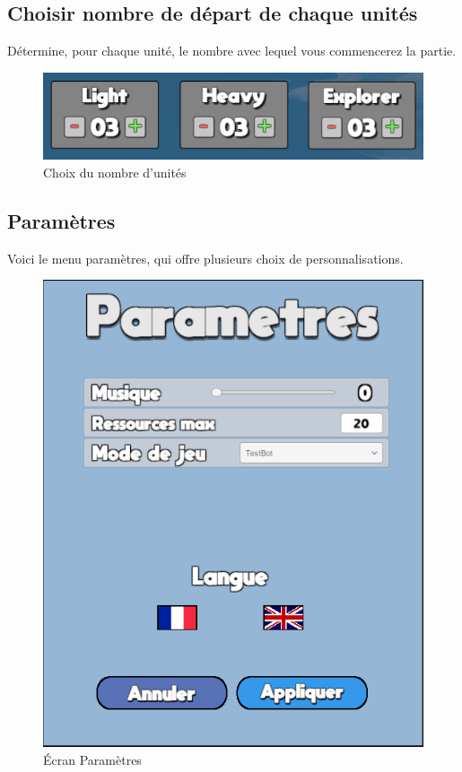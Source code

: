 \documentclass{report}
\begin{document}
\subsection{Choisir nombre de départ de chaque unités}
Détermine, pour chaque unité, le nombre avec lequel vous commencerez la partie.

\begin{figure}[!h]
	\centering
		\includegraphics[scale=0.80]{Nombre_Unit}
	\caption{Choix du nombre d'unités}
\end{figure}


\subsection{Paramètres}
Voici le menu paramètres, qui offre plusieurs choix de personnalisations.
\begin{figure}[!h]
	\centering
		\includegraphics[scale=0.50]{Ecran_Parametre}
	\caption{Écran Paramètres}
\end{figure}
\end{document}

